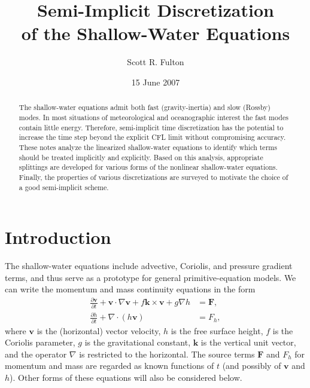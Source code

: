 \documentclass[12pt]{article}
\title{Semi-Implicit Discretization \\
of the Shallow-Water Equations}
\author{Scott R. Fulton
}
\date{15 June 2007}
\newcommand{\cross}{\times}
\newcommand{\del}{\nabla}
\begin{document}
\maketitle


\begin{abstract}


The shallow-water equations admit both fast (gravity-inertia) and slow
(Rossby) modes.  In most situations of meteorological and oceanographic
interest the fast modes contain little energy.  Therefore, semi-implicit time
discretization has the potential to increase the time step beyond the explicit
CFL limit without compromising accuracy.  These notes analyze the linearized
shallow-water equations to identify which terms should be treated implicitly
and explicitly.  Based on this analysis, appropriate splittings are developed
for various forms of the nonlinear shallow-water equations.  Finally, the
properties of various discretizations are surveyed to motivate the choice of a
good semi-implicit scheme.

\end{abstract}

\thispagestyle{empty}




\pagebreak[4]
\section{Introduction}
\setcounter{equation}{0}

\newcommand{\vecv}{\mathbf{v}}
\newcommand{\vecV}{\mathbf{V}}
\newcommand{\veck}{\mathbf{k}}
\newcommand{\Fmom}{\mathbf{F}}
\newcommand{\Fmass}{F_h}
\newcommand{\Feta}{F_{\eta}}
\newcommand{\Fdelta}{F_{\delta}}
\newcommand{\solvec}{\psi}
The shallow-water equations include advective, Coriolis, and pressure gradient
terms, and thus serve as a prototype for general primitive-equation models.
We can write the momentum and mass continuity equations in the form
\begin{align}
  \frac{\partial \vecv}{\partial t} + \vecv\cdot\del\vecv 
    + f\veck\cross\vecv + g\del h &= \Fmom, 
\label{SW:momentum}
\\
  \frac{\partial h}{\partial t} + \del\cdot(h\vecv) &= \Fmass,
\label{SW:continuity}
\end{align}
where $\vecv$ is the (horizontal) vector velocity, $h$ is the free surface
height, $f$ is the Coriolis parameter, $g$ is the gravitational constant,
$\veck$ is the vertical unit vector, and the operator $\del$ is restricted to
the horizontal.  The source terms $\Fmom$ and $\Fmass$ for momentum and mass
are regarded as known functions of $t$ (and possibly of $\vecv$ and $h$).
Other forms of these equations will also be considered below.
\end{document}
